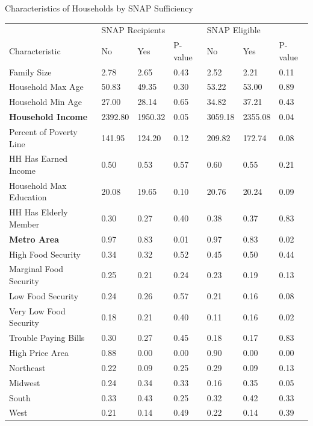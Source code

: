 \documentclass{beamer}
\begin{document}


\begin{frame}
\begin{table}{Characteristics of Households by SNAP Sufficiency}%

\begin{adjustbox}{max width=\textwidth}
  \centering
     \begin{tabular}{lllllll}
    \toprule
    & \multicolumn{3}{l}{SNAP Recipients} & \multicolumn{3}{l}{SNAP Eligible} \\

    Characteristic & No    & Yes   & P-value & No    & Yes   & P-value \\
    \midrule
    Family Size & 2.78  & 2.65  & 0.43  & 2.52  & 2.21  & 0.11 \\
    Household Max Age & 50.83 & 49.35 & 0.30  & 53.22 & 53.00 & 0.89 \\
    Household Min Age & 27.00 & 28.14 & 0.65  & 34.82 & 37.21 & 0.43 \\
    \textbf{Household Income} & 2392.80 & 1950.32 & 0.05  & 3059.18 & 2355.08 & 0.04 \\
    Percent of Poverty Line & 141.95 & 124.20 & 0.12  & 209.82 & 172.74 & 0.08 \\
    HH Has Earned Income & 0.50  & 0.53  & 0.57  & 0.60  & 0.55  & 0.21 \\
    Household Max Education & 20.08 & 19.65 & 0.10  & 20.76 & 20.24 & 0.09 \\
    HH Has Elderly Member & 0.30  & 0.27  & 0.40  & 0.38  & 0.37  & 0.83 \\
      \textbf{Metro Area} & 0.97  & 0.83  & 0.01  & 0.97  & 0.83  & 0.02 \\
    High Food Security & 0.34  & 0.32  & 0.52  & 0.45  & 0.50  & 0.44 \\
    Marginal Food Security & 0.25  & 0.21  & 0.24  & 0.23  & 0.19  & 0.13 \\
    Low Food Security & 0.24  & 0.26  & 0.57  & 0.21  & 0.16  & 0.08 \\
    Very Low Food Security & 0.18  & 0.21  & 0.40  & 0.11  & 0.16  & 0.02 \\
    Trouble Paying Bills & 0.30  & 0.27  & 0.45  & 0.18  & 0.17  & 0.83 \\
    High Price Area & 0.88  & 0.00  & 0.00  & 0.90  & 0.00  & 0.00 \\
    Northeast & 0.22  & 0.09  & 0.25  & 0.29  & 0.09  & 0.13 \\
    Midwest & 0.24  & 0.34  & 0.33  & 0.16  & 0.35  & 0.05 \\
    South & 0.33  & 0.43  & 0.25  & 0.32  & 0.42  & 0.33 \\
    West  & 0.21  & 0.14  & 0.49  & 0.22  & 0.14  & 0.39 \\


\end{tabular}
\end{adjustbox}
\end{table}
\end{frame}
\end{document}
